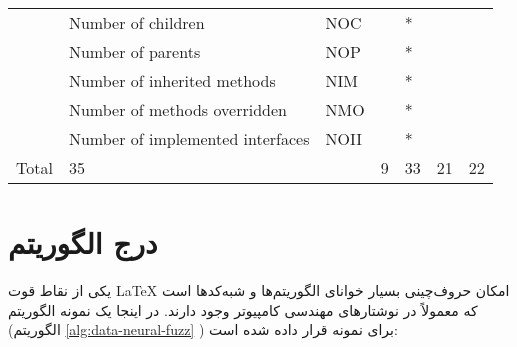 \begin{table}[!h]
{\begin{latin}
\begin{tabular}{lllllll}
            & Number of children                               & NOC         &        & *     &      &         \\
            & Number of parents                                & NOP         &        & *     &      &         \\
            & Number of inherited   methods                    & NIM         &        & *     &      &         \\
            & Number of methods   overridden                   & NMO         &        & *     &      &         \\
            & Number of implemented interfaces                 & NOII        &        & *     &      &         \\
            Total       & 35                                               &             & 9      & 33    & 21   & 22      \\ \hline
        \end{tabular}%
        \end{latin}   
 }
\end{table}
 
 
 \section{درج الگوریتم}
 یکی از نقاط قوت 
 \LaTeX
 امکان حروف‌چینی بسیار خوانای الگوریتم‌ها و شبه‌کدها است که معمولاً در نوشتارهای مهندسی کامپیوتر وجود دارند. در اینجا یک نمونه الگوریتم (الگوریتم 
  \ref{alg:data-neural-fuzz}
 ) برای نمونه قرار داده شده است:
 

